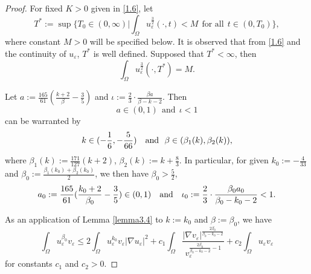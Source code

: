 \documentclass[12pt]{article}
\theoremstyle{plain}
\theoremstyle{definition}
\numberwithin{equation}{section}
\begin{document}
\begin{proof}
For fixed $K>0$  given in \eqref{1.6}, %
let
$$T^*:=\sup\bigg\{T_0\in(0,\infty)|\int_\Omega u_\varepsilon^{\frac{3}{2}}(\cdot,t)<M~~\mbox{for all}~~t\in(0,T_0)\bigg\},$$
where constant $M>0$ will be specified below. It is observed that from \eqref{1.6} and the continuity of $u_\varepsilon$, $T^*$ is well defined.
Supposed that $T^*<\infty$,  then
$$ \int_\Omega u_\varepsilon^{\frac{3}{2}}(\cdot,T^*)=M.$$

Let
$    a:=\frac{165}{61}(\frac{k+2}{\beta}-\frac{3}{5})$ and $\iota:=\frac{2}{3}\cdot\frac{\beta a}{\beta-k-2}.
$
Then \begin{equation*}
   a\in(0,1)~~\mbox{and}~~ \iota<1
\end{equation*}
can be warranted by
\begin{equation*}
k\in(-\frac{1}{6},-\frac{5}{66}) ~~~\hbox{and}~~
\beta\in(\beta_1(k),\beta_2(k)),
\end{equation*}
where $\beta_1(k):=\frac{171}{127}(k+2)$,  $\beta_2(k):=k+\frac{8}{3}$. In particular,  for given  $k_0:=-\frac 4 {33}$ and $\beta_0:=\frac{\beta_1(k_0)+\beta_2(k_0)} 2$,  we then have $ \beta_0>\frac 52$,
 \begin{equation}\label{3.8}
a_0:=\frac{165}{61}(\frac{k_0+2}{\beta_0}-\frac{3}{5})\in(0,1)~~~\hbox{and}~~~
      \iota_0:=\frac{2}{3}\cdot\frac{\beta_0 a_0}{\beta_0-k_0-2}<1.
 \end{equation}

As an application of Lemma \ref{lemma3.4} to $k:=k_0$ and $\beta:=\beta_0$, we have
\begin{equation}\label{3.9}
 \int_\Omega u_\varepsilon^{\beta_0}v_\varepsilon\leq
 2\int_{\Omega}u_\varepsilon^{k_0}v_\varepsilon|\nabla u_\varepsilon|^2+c_1\int_\Omega\frac{|\nabla v_\varepsilon|^{\frac{2\beta_0}{\beta_0-k_0-2}}}{v_\varepsilon^{\frac{2\beta_0}{\beta_0-k_0-2}-1}}
 +c_2\int_{\Omega}u_\varepsilon v_\varepsilon
        \end{equation}
for constants  $c_1$ and $c_2>0$.


\end{proof}
\end{document}
